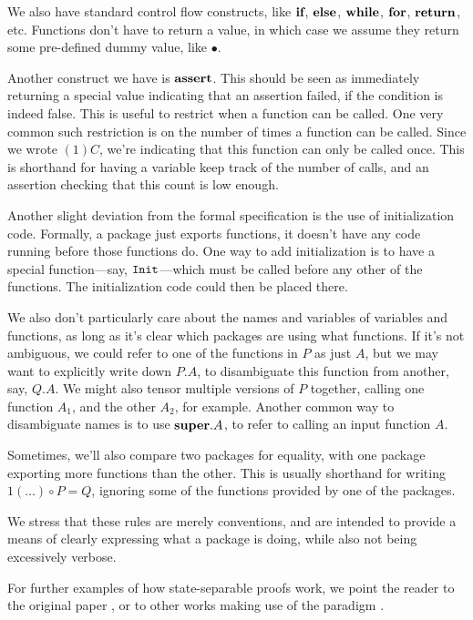 We also have standard control flow constructs, like $\textbf{if}$,
$\textbf{else}$, $\textbf{while}$, $\textbf{for}$, $\textbf{return}$, etc.
Functions don't have to return a value,
in which case we assume they return some pre-defined dummy
value, like $\bullet$.

Another construct we have is $\textbf{assert}$.
This should be seen as immediately returning a special value
indicating that an assertion failed, if the condition is indeed
false.
This is useful to restrict when a function can be called.
One very common such restriction is on the number of times
a function can be called.
Since we wrote $(1)C$, we're indicating that this function
can only be called once.
This is shorthand for having a variable keep track of the number
of calls, and an assertion checking that this count is low
enough.

Another slight deviation from the formal specification is the use
of initialization code.
Formally, a package just exports functions,
it doesn't have any code running before those functions do.
One way to add initialization is to have a special function---say, $\texttt{Init}$---which must be called before any other of the functions.
The initialization code could then be placed there.

We also don't particularly care about the names and variables
of variables and functions, as long as it's clear which packages
are using what functions.
If it's not ambiguous, we could refer to one of the functions
in $P$ as just $A$,
but we may want to explicitly write down $P.A$, to disambiguate this
function from another, say, $Q.A$.
We might also tensor multiple versions of $P$ together,
calling one function $A_1$, and the other $A_2$, for example.
Another common way to disambiguate names is
to use $\textbf{super}.A$, to refer to calling an input function $A$.

Sometimes, we'll also compare two packages for equality,
with one package exporting more functions than the other.
This is usually shorthand for writing $1(\ldots) \circ P = Q$,
ignoring some of the functions provided by one of the packages.

We stress that these rules are merely conventions,
and are intended to provide a means of clearly expressing
what a package is doing, while also not being excessively verbose.

For further examples of how state-separable proofs work,
we point the reader to the original paper
\cite{AC:BDFKK18}, or
to other works making use of the paradigm
\cite{joyofcryptography, mei22}.
